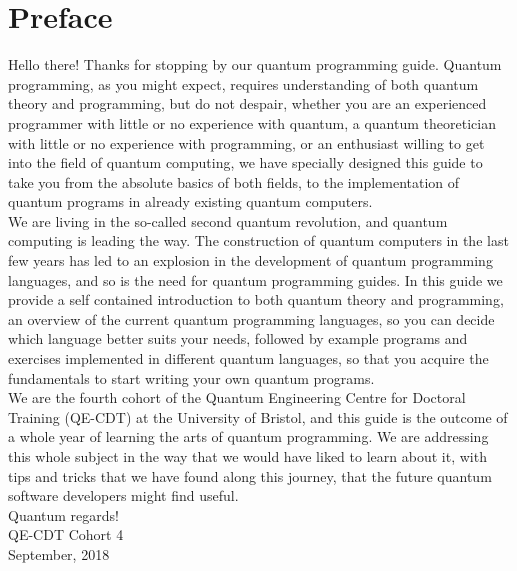 \chapter*{Preface}


Hello there! Thanks for stopping by our quantum programming guide. Quantum programming, as you might expect, requires understanding of both quantum theory and programming, but do not despair, whether you are an experienced programmer with little or no experience with quantum, a quantum theoretician with little or no experience with programming, or an enthusiast willing to get into the field of quantum computing, we have specially designed this guide to take you from the absolute basics of both fields, to the implementation of quantum programs in already existing quantum computers.\\

\noindent
We are living in the so-called second quantum revolution, and quantum computing is leading the way. The construction of quantum computers in the last few years has led to an explosion in the development of quantum programming languages, and so is the need for quantum programming guides. In this guide we provide a self contained introduction to both quantum theory and programming, an overview of the current quantum programming languages, so you can decide which language better suits your needs, followed by example programs and exercises implemented in different quantum languages, so that you acquire the fundamentals to start writing your own quantum programs.\\

\noindent
We are the fourth cohort of the Quantum Engineering Centre for Doctoral Training (QE-CDT) at the University of Bristol, and this guide is the outcome of a whole year of learning the arts of quantum programming. We are addressing this whole subject in the way that we would have liked to learn about it, with tips and tricks that we have found along this journey, that the future quantum software developers might find useful.\\

\noindent
Quantum regards!\\

\noindent
QE-CDT Cohort 4\\

\noindent
September, 2018

